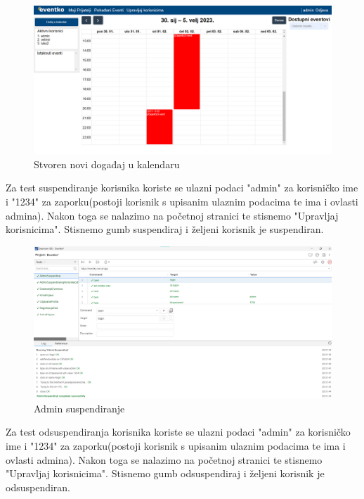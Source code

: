  			\begin{figure}[H]
 				\includegraphics[width=\textwidth]{Slike/Kalendar.png}
 				\caption{Stvoren novi događaj u kalendaru}
 			\end{figure}
 			
 			\indent Za test suspendiranje korisnika koriste se ulazni podaci "admin" za korisničko ime i "1234" za zaporku(postoji korisnik s upisanim ulaznim podacima te ima i ovlasti admina). Nakon toga se nalazimo na početnoj stranici te stisnemo "Upravljaj korisnicima". Stisnemo gumb suspendiraj i željeni korisnik je suspendiran.
 			
 			\begin{figure}[H]
 				\includegraphics[width=\textwidth]{Slike/AdminSuspendirajSelenium.png}
 				\caption{Admin suspendiranje}
 			\end{figure}
 		
 		
 			\indent Za test odsuspendiranja korisnika koriste se ulazni podaci "admin" za korisničko ime i "1234" za zaporku(postoji korisnik s upisanim ulaznim podacima te ima i ovlasti admina). Nakon toga se nalazimo na početnoj stranici te stisnemo "Upravljaj korisnicima". Stisnemo gumb odsuspendiraj i željeni korisnik je odsuspendiran.
 			
